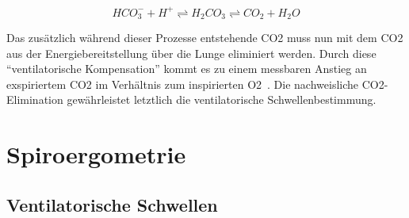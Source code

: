 \begin{equation}
HCO_3^- + H^+ \rightleftharpoons H_2CO_3 \rightleftharpoons CO_2 + H_2O
\label{eq:formel5}
\end{equation}

Das zusätzlich während dieser Prozesse entstehende \acs{CO2} muss nun mit dem \acs{CO2} aus der Energiebereitstellung über die Lunge eliminiert werden. Durch diese "`ventilatorische Kompensation"' kommt es zu einem messbaren Anstieg an exspiriertem \acs{CO2} im Verhältnis zum inspirierten \acs{O2}~\cite{Boening.2008}. Die nachweisliche \ac{CO2}-Elimination gewährleistet letztlich die ventilatorische Schwellenbestimmung.
%
\section{Spiroergometrie}

\subsection{Ventilatorische Schwellen}

